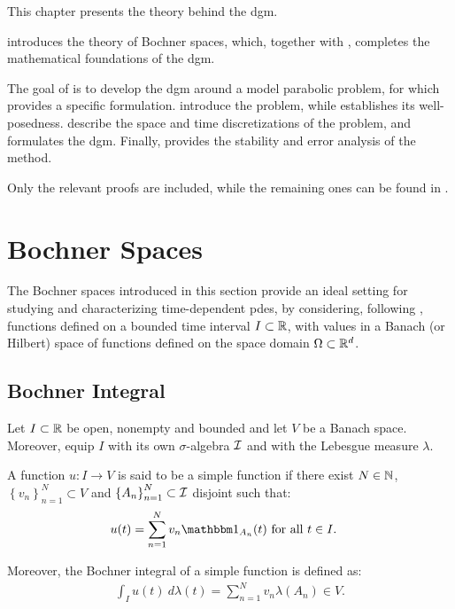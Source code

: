 This chapter presents the theory behind the \acrlong{dgm}.

 introduces the theory of Bochner spaces, which, together with , completes the mathematical foundations of the \acrshort{dgm}.

The goal of  is to develop the \acrshort{dgm} around a model parabolic problem, for which  provides a specific formulation.  introduce the problem, while  establishes its well-posedness.  describe the space and time discretizations of the problem, and  formulates the \acrshort{dgm}. Finally,  provides the stability and error analysis of the method.

Only the relevant proofs are included, while the remaining ones can be found in .

\newpage
\section{Bochner Spaces} \label{sec:bochner}

The Bochner spaces introduced in this section provide an ideal setting for studying and characterizing time-dependent \acrshort{pdes}, by considering, following \cite[p.~111]{Ern2021}, functions defined on a bounded time interval $I \subset \mathbb{R}$, with values in a Banach (or Hilbert) space of functions defined on the space domain $\Omega \subset \mathbb{R}^{d}$.

\subsection{Bochner Integral}

Let $I \subset \mathbb{R}$ be open, nonempty and bounded and let $V$ be a Banach space. Moreover, equip $I$ with its own $\sigma$-algebra $\mathcal{I}$ and with the Lebesgue measure $\lambda$.

\begin{definition}
    A function $u\colon I \rightarrow V$ is said to be a simple function if there exist $N \in \mathbb{N}$, $\left\{ v_n \right\}_{n = 1}^N \subset V$ and $\left\{ A_n \right\}_{n = 1}^N \subset \mathcal{I}$ disjoint such that:
    \begin{align}
        u(t) = \sum_{n = 1}^N v_n \Characteristic{A_n}(t) &\text{ for all } t \in I.
    \end{align}

    Moreover, the Bochner integral of a simple function is defined as:
    \begin{align}
        \int_I u(t) ~ d \lambda(t)  = \sum_{n = 1}^N v_n \lambda(A_n) \in V.
    \end{align}
\end{definition}

